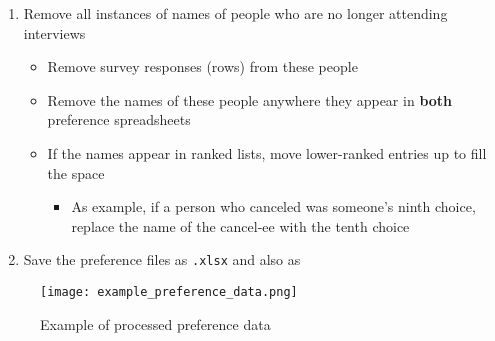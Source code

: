 \begin{enumerate}
\begin{itemize}
		\end{itemize}
	\item Remove all instances of names of people who are no longer attending interviews
		\begin{itemize}
			\item Remove survey responses (rows) from these people
			\item Remove the names of these people anywhere they appear in \textbf{both} preference spreadsheets
			\item If the names appear in ranked lists, move lower-ranked entries up to fill the space
				\begin{itemize}
					\item As example, if a person who canceled was someone's ninth choice, replace the name of the cancel-ee with the tenth choice
				\end{itemize}
		\end{itemize}
	\item Save the preference files as \texttt{.xlsx} and also as 
			
	
			
			
\end{enumerate}


\begin{figure}
	\centering
	\texttt{[image: example\_preference\_data.png]}
	\caption{\label{fig:example_preference_data} Example of processed preference data}
\end{figure}

